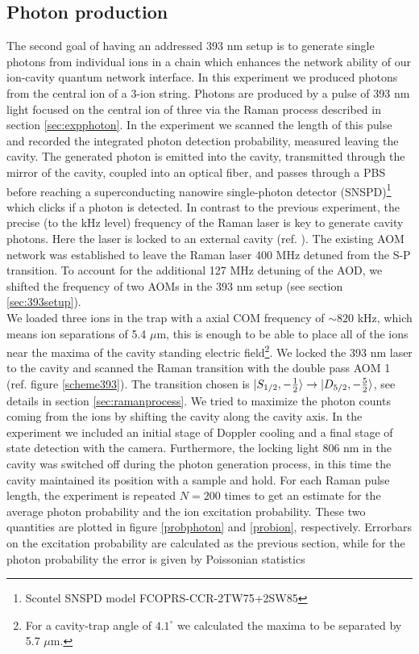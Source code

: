 \subsection{Photon production}
\label{exp:photons}
The second goal of having an addressed 393 nm setup is to generate single photons from individual ions in a chain which enhances the network ability of our ion-cavity quantum network interface. In this experiment we produced photons from the central ion of a 3-ion string. Photons are produced by a pulse of 393 nm light focused on the central ion of three via the Raman process described in section \ref{sec:expphoton}. In the experiment we scanned the length of this pulse and recorded the integrated photon detection probability, measured leaving the cavity. The generated photon is emitted into the cavity, transmitted through the mirror of the cavity, coupled into an optical fiber, and passes through a PBS before reaching a superconducting nanowire single-photon detector (SNSPD)\footnote{Scontel SNSPD model FCOPRS-CCR-2TW75+2SW85} which clicks if a photon is detected. In contrast to the previous experiment, the precise (to the kHz level) frequency of the Raman laser is key to generate cavity photons. Here the laser is locked to an external cavity (ref. \cite{helene}). The existing AOM network was established to leave the Raman laser 400 MHz detuned from the S-P transition. To account for the additional 127 MHz detuning of the AOD, we shifted the frequency of two AOMs in the 393 nm setup (see section \ref{sec:393setup}).\\
We loaded three ions in the trap with a axial COM frequency of $\sim 820$ kHz, which means ion separations of 5.4 $\mu$m, this is enough to be able to place all of the ions near the maxima of the cavity standing electric field\footnote{For a cavity-trap angle of $4.1^\circ$ we calculated the maxima to be separated by 5.7 $\mu$m.}. We locked the 393 nm laser to the cavity and scanned the Raman transition with the double pass AOM 1 (ref. figure \ref{scheme393}). The transition chosen is $\ket{S_{1/2},-\frac{1}{2}}\to \ket{D_{5/2},-\frac{5}{2}}$, see details in section \ref{sec:ramanprocess}. We tried to maximize the photon counts coming from the ions by shifting the cavity along the cavity axis.
In the experiment we included an initial stage of Doppler cooling and a final stage of state detection with the camera. Furthermore, the locking light 806 nm in the cavity was switched off during the photon generation process, in this time the cavity maintained its position with a sample and hold. For each Raman pulse length, the experiment is repeated $N=200$ times to get an estimate for the average photon probability and the ion excitation probability. These two quantities are plotted in figure \ref{probphoton} and \ref{probion}, respectively. Errorbars on the excitation probability are calculated as the previous section, while for the photon probability the error is given by Poissonian statistics \cite{quantumoptics}
